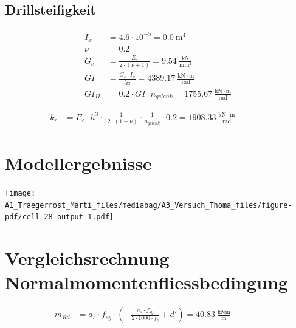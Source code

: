 \documentclass[
  11pt,
  letterpaper,
]{scrreprt}
\begin{document}
\subsection{Drillsteifigkeit}\label{drillsteifigkeit}

\[
\begin{aligned}
I_{x}& = 4.6 \cdot 10^{-5} = 0.0 \ \mathrm{m}^{4} \\ 
\nu& = 0.2 \\ 
G_{c}& = \frac{E_{c}}{2 \cdot \left(\nu + 1\right)} = 9.54 \ \frac{\mathrm{kN}}{\mathrm{mm}^{2}} \\ 
GI& = \frac{G_{c} \cdot I_{x}}{l_{El}} = 4389.17 \ \frac{\mathrm{kN} \cdot \mathrm{m}}{\mathrm{rad}} \\ 
GI_{II}& = 0.2 \cdot GI \cdot n_{gelenk} = 1755.67 \ \frac{\mathrm{kN} \cdot \mathrm{m}}{\mathrm{rad}} \end{aligned}
\]

\[
\begin{aligned}
k_{r}& = E_{c} \cdot h^{3} \cdot \frac{1}{12 \cdot \left(1 - \nu\right)} \cdot \frac{1}{n_{gelenk}} \cdot 0.2 = 1908.33 \ \frac{\mathrm{kN} \cdot \mathrm{m}}{\mathrm{rad}} \quad &  \quad &  
 \end{aligned}
\]

\section{Modellergebnisse}\label{modellergebnisse}

\texttt{[image: A1\_Traegerrost\_Marti\_files/mediabag/A3\_Versuch\_Thoma\_files/figure-pdf/cell-28-output-1.pdf]}

\section{Vergleichsrechnung
Normalmomentenfliessbedingung}\label{vergleichsrechnung-normalmomentenfliessbedingung}

\[
\begin{aligned}
m_{Rd}& = a_{s} \cdot f_{sy} \cdot \left(- \frac{a_{s} \cdot f_{sy}}{2 \cdot 1000 \cdot f_{c}} + {d}'\right) = 40.83 \ \frac{\mathrm{kNm}}{\mathrm{m}} \quad &  \quad &  
 \end{aligned}
\]
\end{document}
